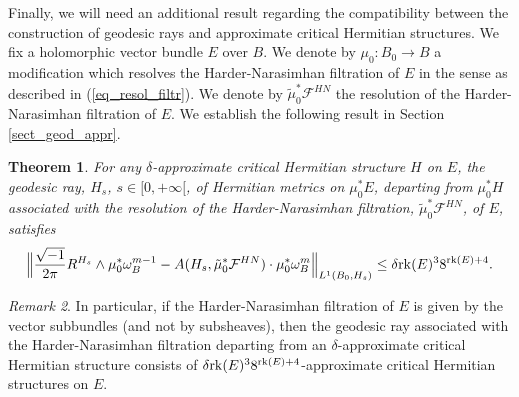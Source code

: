 \documentclass[12pt]{article}
\numberwithin{equation}{section}
\theoremstyle{theorem}
\newtheorem{thm}{Theorem}[section]
\theoremstyle{definition}
\theoremstyle{remark}
\newtheorem{rem}[thm]{Remark}
\newcommand{\imun} {\sqrt{-1}}
\newcommand{\rk}[1]{{\rm{rk}} ( #1 )}
\begin{document}
	Finally, we will need an additional result regarding the compatibility between the construction of geodesic rays and approximate critical Hermitian structures.
	We fix a holomorphic vector bundle $E$ over $B$.
	We denote by $\mu_0 : B_0 \to B$ a modification which resolves the Harder-Narasimhan filtration of $E$ in the sense as described in (\ref{eq_resol_filtr}).
	We denote by $\tilde{\mu}_0^* \mathcal{F}^{HN}$ the resolution of the Harder-Narasimhan filtration of $E$.
	We establish the following result in Section \ref{sect_geod_appr}.
	\begin{thm}\label{thm_ray_apprx}
		For any $\delta$-approximate critical Hermitian structure $H$ on $E$, the geodesic ray, $H_s$, $s \in [0, +\infty[$, of Hermitian metrics on $\mu_0^* E$, departing from $\mu_0^* H$ associated with the resolution of the Harder-Narasimhan filtration, $\tilde{\mu}_0^* \mathcal{F}^{HN}$, of $E$, satisfies
		\begin{equation}\label{eq_appr_crhs_resol}
		\Big\|
			\frac{\imun}{2 \pi} R^{H_s} \wedge \mu_0^* \omega_B^{m - 1}
			-
			A(H_s, \tilde{\mu}_0^* \mathcal{F}^{HN}) \cdot \mu_0^* \omega_B^m
		\Big\|_{L^1(B_0, H_s)}
		\leq
		\delta \rk{E}^3 8^{\rk{E} + 4}.
	\end{equation}
	\end{thm}
	\begin{rem}
		In particular, if the Harder-Narasimhan filtration of $E$ is given by the vector subbundles (and not by subsheaves), then the geodesic ray associated with the Harder-Narasimhan filtration departing from an $\delta$-approximate critical Hermitian structure consists of $\delta \rk{E}^3 8^{\rk{E} + 4}$-approximate critical Hermitian structures on $E$.
	\end{rem}
	
\end{document}

